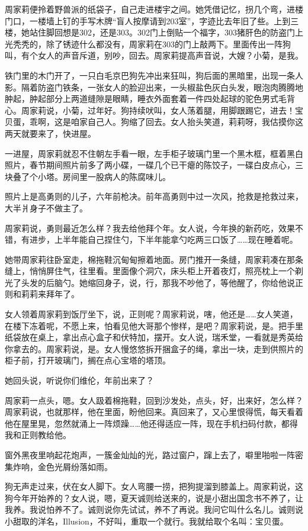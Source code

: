 \documentclass[lang=cn,newtx,12pt,scheme=chinese]{elegantbook}
\begin{document}
周家莉便拎着野兽派的纸袋子，自己走进楼宇之间。她凭借记忆，拐几个弯，进楼门口，一楼墙上钉的手写木牌“盲人按摩请到203室”，字迹比去年旧了些。上到三楼，她站住脚回想是302，还是303。302门上倒贴一个福字，303猪肝色的防盗门上光秃秃的，除了锈迹什么都没有，周家莉在303的门上敲两下。里面传出一阵狗叫，有个女人的声音斥道，别吵，回去。周家莉提高声音说，大嫂？小菊，是我。

铁门里的木门开了，一只白毛京巴狗先冲出来狂叫，狗后面的黑暗里，出现一条人影。隔着防盗门铁条，一张女人的脸迎出来，一头椒盐色灰白头发，眼泡肉腾腾地肿起，肿起部分上两道缝隙是眼睛，睡衣外面套着一件四处起球的驼色男式毛背心。周家莉说，小菊，过年好。狗持续吠叫，女人荡着腿，用脚跟踢它，进去！宝贝蛋，乖啊，这是咱家自己人。狗缩了回去。女人抬头笑道，莉莉呀，我估摸你这两天就要来了，快进屋。

一进屋，周家莉就忍不住朝左手看一眼，左手柜子玻璃门里一个黑木框，框着黑白照片，春节期间照片前多了两小碟，一碟几个已干瘪的陈饺子，一碟白皮点心，三块叠了个小塔。房间里一股病人的陈腐味儿。

照片上是高勇则的儿子，六年前枪决。前年高勇则中过一次风，抢救是抢救过来，大半爿身子不做主了。

周家莉说，勇则最近怎么样？我去给他拜个年。女人说，今年换的新药吃，效果不错，有进步，上半年能自己捏住勺，下半年能拿勺吃两三口饭了……现在睡着呢。

她带周家莉往卧室走，棉拖鞋沉甸甸擦着地面。房门推开一条缝，周家莉凑在那条缝上，悄悄屏住气，往里看。里面像个洞穴，床头柜上开着夜灯，照亮枕上一个剃光了头发的后脑勺。她缩回身子，说，行，那我不吵他了，等他醒了，你给他说正则和莉莉来拜年了。

女人领着周家莉到饭厅坐下，说，正则呢？周家莉说，嗐，他还是……女人笑道，在楼下冻着呢，不愿上来，怕看见他大哥那个惨样，是吧？周家莉说，是。把手里纸袋放在桌上，拿出点心盒子和伏特加，摆开。女人说，瑞禾堂，一看就是秀英给你拿去的。周家莉说，是。女人慢悠悠拆开捆盒子的绳，拿出一块，走到供照片的柜子前，打开玻璃门，搁在点心宝塔的塔顶。

她回头说，听说你们维伦，年前出来了？

周家莉一点头，嗯。女人趿着棉拖鞋，回到沙发处，点头，好，出来好，怎么样？周家莉说，也就那样，他在里面，盼他回来。真回来了，又心里恨得慌，每天看着他在屋里晃，忽然就涌上一阵烦躁……他还得适应一阵，现在手机扫码付款，都得我和正则教给他。

窗外黑夜里响起花炮声，一簇金灿灿的光，路过窗户，蹿上去了，噼里啪啦一阵密集炸响，金色光屑纷落如雨。

狗无声走过来，伏在女人脚下。女人弯腰一捞，把狗提溜到膝盖上。周家莉说，这狗今年开始养的？女人说，嗯，夏天诚则给送来的，说是小甜出国念书不养了，让我养。我说怕养不了。诚则说你先试试，养不了再说。我问它叫什么名儿。诚则说小甜取的洋名，Illusion，不好叫，重取一个就行。我就给取个名叫：宝贝蛋。
\end{document}
